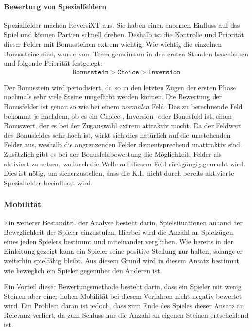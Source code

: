 \paragraph{Bewertung von Spezialfeldern}
Spezialfelder machen ReversiXT aus.
Sie haben einen enormen Einfluss auf das Spiel und k\"onnen Partien schnell drehen.
Deshalb ist die Kontrolle und Priorit\"at dieser Felder mit Bonussteinen extrem wichtig.
Wie wichtig die einzelnen Bonussteine sind, wurde vom Team gemeinsam in den ersten Stunden beschlossen und folgende Priorit\"at festgelegt:
\begin{align}
    \texttt{Bonusstein} > \texttt{Choice} > \texttt{Inversion}
\end{align}

Der Bonusstein wird periodisiert, da so in den letzten Z\"ugen der ersten Phase nochmals sehr viele Steine umgef\"arbt werden k\"onnen.
Die Bewertung der Bonusfelder ist genau so wie bei einem \textit{normalen} Feld.
Das zu berechnende Feld bekommt je nachdem, ob es ein Choice-, Inversion- oder Bonusfeld ist, einen Bonuswert, der es bei der Zugauswahl extrem attraktiv macht.
Da der Feldwert des Bonusfeldes sehr hoch ist, wirkt sich dies nat\"urlich auf die umstehenden Felder aus, weshalb die angrenzenden Felder dementsprechend unattraktiv sind.
Zus\"atzlich gibt es bei der Bonusfeldbewertung die M\"oglichkeit, Felder als aktiviert zu setzen, wodurch die Welle auf diesem Feld r\"uckg\"angig gemacht wird.
Dies ist n\"otig, um sicherzustellen, dass die K.I.\ nicht durch bereits aktivierte Spezialfelder beeinflusst wird.

\subsubsection{Mobilit\"at}\label{subsubsec:mobilitaet}
Ein weiterer Bestandteil der Analyse besteht darin, Spielsituationen anhand der Beweglichkeit der Spieler einzustufen.
Hierbei wird die Anzahl an Spielz\"ugen eines jeden Spielers bestimmt und miteinander verglichen.
Wie bereits in der Einleitung gezeigt kann ein Spieler seine positive Stellung nur halten, solange er weiterhin spielf\"ahig bleibt.
Aus diesem Grund wird in diesem Ansatz bestimmt wie beweglich ein Spieler gegen\"uber den Anderen ist.

Ein Vorteil dieser Bewertungsmethode besteht darin, dass ein Spieler mit wenig Steinen aber einer hohen Mobilit\"at bei diesem Verfahren nicht negativ bewertet wird.
Ein Problem daran ist jedoch, dass zum Ende des Spieles dieser Ansatz an Relevanz verliert, da zum Schluss nur die Anzahl an eigenen Steinen entscheidend ist.

